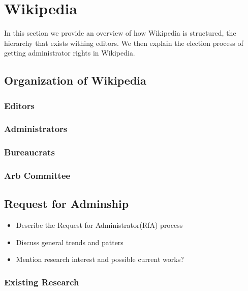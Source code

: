 \chapter{Wikipedia}
\label{chp:wikipedia}
In this section we provide an overview of how Wikipedia is structured, the hierarchy that exists withing editors. We then explain the election process of getting administrator rights in Wikipedia.

\section{Organization of Wikipedia}
\subsection{Editors}
\subsection{Administrators}
\subsection{Bureaucrats}
\subsection{Arb Committee}

\section{Request for Adminship}
\begin{itemize}
    \item Describe the Request for Administrator(RfA) process
    \item Discuss general trends and patters
    \item Mention research interest and possible current works?
\end{itemize}

\subsection{Existing Research}